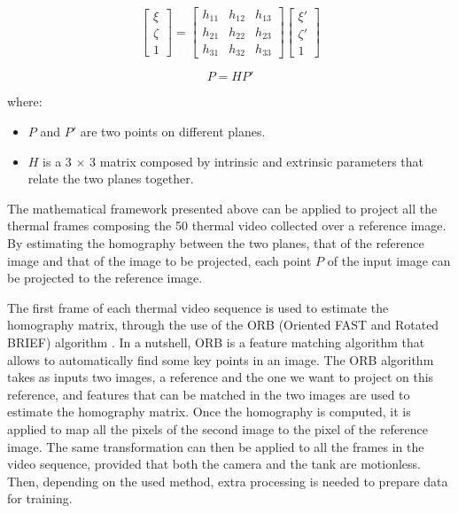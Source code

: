\begin{equation}
    \begin{bmatrix} \xi\\ \zeta\\ 1 \end{bmatrix} = 
        \begin{bmatrix}
        h_{11}& h_{12} & h_{13} \\ 
        h_{21}& h_{22} & h_{23} \\
        h_{31}& h_{32} & h_{33}
        \end{bmatrix}
        \begin{bmatrix} \xi'\\ \zeta'\\ 1 \end{bmatrix}
\end{equation}

\begin{equation} \label{projection}
P=HP'
\end{equation}

where:

\begin{itemize}
    \item $P$ and $P'$ are two points on different planes.
    \item $H$ is a 3 $\times$ 3 matrix composed by intrinsic and extrinsic parameters that relate the two planes together.
\end{itemize}


The mathematical framework presented above can be applied to project all the thermal frames composing the 50 thermal video collected over a reference image. By estimating the homography between the two planes, that of the reference image and that of the image to be projected, each point $P$ of the input image can be projected to the reference image. 

The first frame of each thermal video sequence is used to estimate the homography matrix, through the use of the ORB (Oriented FAST and Rotated BRIEF) algorithm \citep{rublee2011orb}. In a nutshell, ORB is a feature matching algorithm that allows to automatically find some key points in an image. The ORB algorithm takes as inputs two images, a reference and the one we want to project on this reference, and features that can be matched in the two images are used to estimate the homography matrix. Once the homography is computed, it is applied to map all the pixels of the second image to the pixel of the reference image. The same transformation can then be applied to all the frames in the video sequence, provided that both the camera and the tank are motionless. 
%
Then, depending on the used method, extra processing is needed to prepare data for training.

